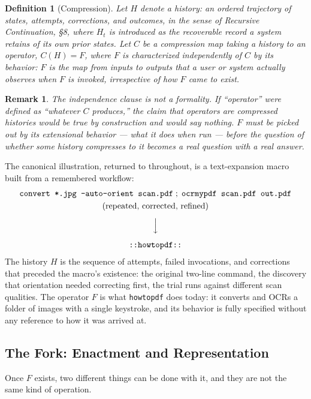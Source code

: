 \documentclass[11pt]{article}
\newtheorem{definition}{Definition}[section]
\newtheorem*{remark}{Remark}
\begin{document}
\begin{definition}[Compression]
Let $H$ denote a history: an ordered trajectory of states, attempts, corrections, and outcomes, in the sense of \emph{Recursive Continuation}, \S 8, where $H_t$ is introduced as the recoverable record a system retains of its own prior states. Let $C$ be a compression map taking a history to an operator, $C(H) = F$, where $F$ is characterized independently of $C$ by its behavior: $F$ is the map from inputs to outputs that a user or system actually observes when $F$ is invoked, irrespective of how $F$ came to exist.
\end{definition}

\begin{remark}
The independence clause is not a formality. If ``operator'' were defined as ``whatever $C$ produces,'' the claim that operators are compressed histories would be true by construction and would say nothing. $F$ must be picked out by its extensional behavior — what it does when run — before the question of whether some history compresses to it becomes a real question with a real answer.
\end{remark}

The canonical illustration, returned to throughout, is a text-expansion macro built from a remembered workflow:
\[
\begin{gathered}
\texttt{convert *.jpg -auto-orient scan.pdf}\;;\;\texttt{ocrmypdf scan.pdf out.pdf} \\
\text{(repeated, corrected, refined)} \\[4pt]
\Big\downarrow \\[4pt]
\texttt{::howtopdf::}
\end{gathered}
\]
The history $H$ is the sequence of attempts, failed invocations, and corrections that preceded the macro's existence: the original two-line command, the discovery that orientation needed correcting first, the trial runs against different scan qualities. The operator $F$ is what \texttt{howtopdf} does today: it converts and OCRs a folder of images with a single keystroke, and its behavior is fully specified without any reference to how it was arrived at.

\subsection{The Fork: Enactment and Representation}

Once $F$ exists, two different things can be done with it, and they are not the same kind of operation.
\end{document}
